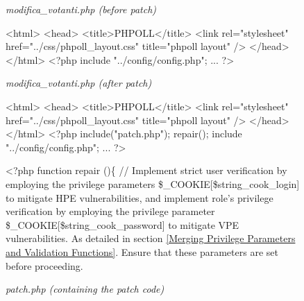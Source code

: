 \documentclass[10pt,journal,compsoc]{IEEEtran}
\begin{document}
\begin{CJK}{UTF8}{gbsn}
\begin{figure*}[h]
\begin{minipage}[t]{0.48\textwidth}
\begin{algorithm}[H]
\renewcommand{\thealgorithm}{}
\small
{}
\caption{\textit{modifica\_votanti.php (before patch)}}
\begin{algorithmic}[1]
\State \textless html\textgreater 
\State \textless head\textgreater 
    \State \textless title\textgreater PHPOLL\textless/title\textgreater 
    \State \textless link rel="stylesheet" href="../css/phpoll\_layout.css" title="phpoll layout" /\textgreater 
\State \textless /head\textgreater 
\State \textless /html\textgreater 
\State \textless ?php
\State include "../config/config.php";
\State ...
\State ?\textgreater 
\end{algorithmic}
\end{algorithm}
\end{minipage}
\hfill
\begin{minipage}[t]{0.48\textwidth}
\begin{algorithm}[H]
\renewcommand{\thealgorithm}{}
\small
{}
\caption{\textit{modifica\_votanti.php (after patch)}}
\begin{algorithmic}[1]
\State \textless html\textgreater 
\State \textless head\textgreater 
    \State \textless title\textgreater PHPOLL\textless/title\textgreater 
    \State \textless link rel="stylesheet" href="../css/phpoll\_layout.css" title="phpoll layout" /\textgreater 
\State \textless/head\textgreater 
\State \textless/html\textgreater 
\State \textless?php
\State \textcolor[rgb]{0.16,0.32,0.66}{include("patch.php");}
\State \textcolor[rgb]{0.16,0.32,0.66}{repair();}
\State include "../config/config.php";
\State ...
\State ?\textgreater 
\end{algorithmic}
\end{algorithm}
\end{minipage}
\hfill
\begin{minipage}[t]{1\textwidth}
\begin{algorithm}[H]
\renewcommand{\thealgorithm}{}
\small
{}
\caption{\textit{patch.php (containing the patch code)}}
\begin{algorithmic}[1]
\State \textless?php
\State function repair ()\{
 \Statex \textcolor[rgb]{0.16,0.32,0.66}{// Implement strict user verification by employing the privilege parameters \$\_COOKIE[\$string\_cook\_login] to mitigate HPE vulnerabilities, and implement role's privilege verification by employing the privilege parameter \$\_COOKIE[\$string\_cook\_password] to mitigate VPE vulnerabilities. As detailed in section \ref{Merging Privilege Parameters and Validation Functions}. Ensure that these parameters are set before proceeding.}

\end{algorithmic}
\end{algorithm}
\end{minipage}
\end{figure*}
\end{CJK}
\end{document}
